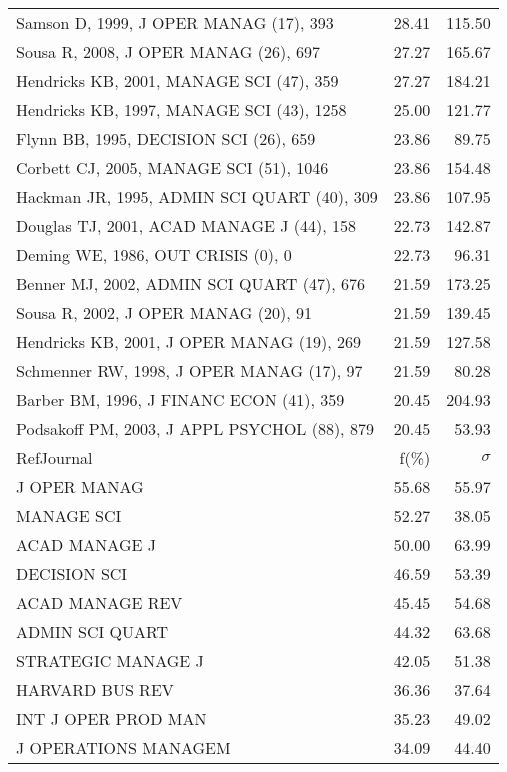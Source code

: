 \documentclass[a4paper,11pt]{report}
\begin{document}
\begin{landscape}
\begin{table}[!ht]
{\begin{tabular}{|l r r|}
Samson D, 1999, J OPER MANAG (17), 393 & 28.41 & 115.50\\
Sousa R, 2008, J OPER MANAG (26), 697 & 27.27 & 165.67\\
Hendricks KB, 2001, MANAGE SCI (47), 359 & 27.27 & 184.21\\
Hendricks KB, 1997, MANAGE SCI (43), 1258 & 25.00 & 121.77\\
Flynn BB, 1995, DECISION SCI (26), 659 & 23.86 & 89.75\\
Corbett CJ, 2005, MANAGE SCI (51), 1046 & 23.86 & 154.48\\
Hackman JR, 1995, ADMIN SCI QUART (40), 309 & 23.86 & 107.95\\
Douglas TJ, 2001, ACAD MANAGE J (44), 158 & 22.73 & 142.87\\
Deming WE, 1986, OUT CRISIS (0), 0 & 22.73 & 96.31\\
Benner MJ, 2002, ADMIN SCI QUART (47), 676 & 21.59 & 173.25\\
Sousa R, 2002, J OPER MANAG (20), 91 & 21.59 & 139.45\\
Hendricks KB, 2001, J OPER MANAG (19), 269 & 21.59 & 127.58\\
Schmenner RW, 1998, J OPER MANAG (17), 97 & 21.59 & 80.28\\
Barber BM, 1996, J FINANC ECON (41), 359 & 20.45 & 204.93\\
Podsakoff PM, 2003, J APPL PSYCHOL (88), 879 & 20.45 & 53.93\\
\hline
\hline
RefJournal & f(\%) & $\sigma$\\
\hline
J OPER MANAG & 55.68 & 55.97\\
MANAGE SCI & 52.27 & 38.05\\
ACAD MANAGE J & 50.00 & 63.99\\
DECISION SCI & 46.59 & 53.39\\
ACAD MANAGE REV & 45.45 & 54.68\\
ADMIN SCI QUART & 44.32 & 63.68\\
STRATEGIC MANAGE J & 42.05 & 51.38\\
HARVARD BUS REV & 36.36 & 37.64\\
INT J OPER PROD MAN & 35.23 & 49.02\\
J OPERATIONS MANAGEM & 34.09 & 44.40\\
\hline
\end{tabular}
}
\end{table}

\clearpage


\end{landscape}
\end{document}
